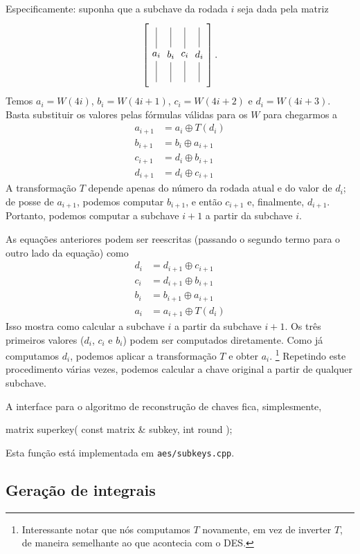 \documentclass{article}
\newcommand{\xor}{\oplus}
\newcommand{\colvec}[1]{
    \tikz[baseline=-3pt]{
        \node (center) at (0, 0) {$#1$};
        \draw (center) -- (0, 1) (0, 1.2);
        \draw (center) -- (0, -1) (0, -1.2);
    }
}
\begin{document}
Especificamente: suponha que a subchave da rodada $i$
seja dada pela matriz
\begin{equation*}
    \left[ \colvec{a_i} \colvec{b_i} \colvec{c_i} \colvec{d_i} \right].
\end{equation*}
Temos $a_i = W(4i)$, $b_i = W(4i+1)$, $c_i = W(4i+2)$ e $d_i = W(4i+3)$.
Basta substituir os valores pelas fórmulas válidas para os $W$
para chegarmos a
\begin{align*}
    a_{i+1} &= a_i \xor T(d_i) \\
    b_{i+1} &= b_i \xor a_{i+1} \\
    c_{i+1} &= d_i \xor b_{i+1} \\
    d_{i+1} &= d_i \xor c_{i+1}
\end{align*}
A transformação $T$ depende apenas do número da rodada atual e do valor de $d_i$;
de posse de $a_{i+1}$, podemos computar $b_{i+1}$,
e então $c_{i+1}$
e, finalmente, $d_{i+1}$.
Portanto, podemos computar a subchave $i+1$ a partir da subchave $i$.

As equações anteriores podem ser reescritas
(passando o segundo termo para o outro lado da equação)
como
\begin{align*}
    d_i &= d_{i+1} \xor c_{i+1} \\
    c_i &= d_{i+1} \xor b_{i+1} \\
    b_i &= b_{i+1} \xor a_{i+1} \\
    a_i &= a_{i+1} \xor T(d_i)
\end{align*}
Isso mostra como calcular a subchave $i$ a partir da subchave $i+1$.
Os três primeiros valores ($d_i$, $c_i$ e $b_i$)
podem ser computados diretamente.
Como já computamos $d_i$, podemos aplicar a transformação $T$
e obter $a_i$.
\footnote{
    Interessante notar que nós computamos $T$ novamente,
    em vez de inverter $T$,
    de maneira semelhante ao que acontecia com o DES.
}
Repetindo este procedimento várias vezes,
podemos calcular a chave original a partir de qualquer subchave.

A interface para o algoritmo de reconstrução de chaves fica, simplesmente,
\begin{cppcode}
    matrix superkey( const matrix & subkey, int round );
\end{cppcode}
Esta função está implementada em \verb"aes/subkeys.cpp".

\subsection{Geração de integrais}
\end{document}
